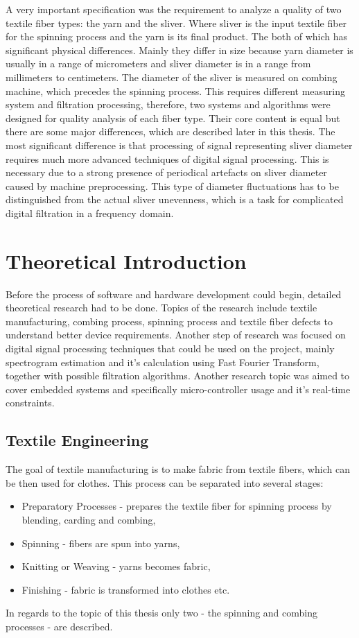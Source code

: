 \documentclass[twoside]{ctuthesis}
\theoremstyle{plain}
\theoremstyle{definition}
\theoremstyle{note}
\begin{document}
A very important specification was the requirement to analyze a quality of two textile fiber types: the  yarn and the sliver. Where sliver is the input textile fiber for the spinning process and the yarn is its final product. The both of which has significant physical differences. Mainly they differ in size because yarn diameter is usually in a range of micrometers and sliver diameter is in a range from millimeters to centimeters. The diameter of the sliver is measured on combing machine, which precedes the spinning process. This requires different measuring system and filtration processing, therefore, two systems and algorithms were designed for quality analysis of each fiber type. Their core content is equal but there are some major differences, which are described later in this thesis. The most significant difference is that processing of signal representing sliver diameter requires much more advanced techniques of digital signal processing. This is necessary due to a strong presence of periodical artefacts on sliver diameter caused by machine preprocessing. This type of diameter fluctuations has to be distinguished from the actual sliver unevenness, which is a task for complicated digital filtration in a frequency domain.

\chapter{Theoretical Introduction}
Before the process of software and hardware development could begin, detailed theoretical research had to be done. Topics of the research include textile manufacturing, combing process, spinning process and textile fiber defects to understand better device requirements. Another step of research was focused on digital signal processing techniques that could be used on the project, mainly spectrogram estimation and it's calculation using Fast Fourier Transform, together with possible filtration algorithms. Another research topic was aimed to cover embedded systems and specifically micro-controller usage and it's real-time constraints.
\section{Textile Engineering}
The goal of textile manufacturing is to make fabric from textile fibers, which can be then used for clothes. This process can be separated into several stages:
\begin{itemize}
	\setlength{\itemsep}{5pt}
\item Preparatory Processes - prepares the textile fiber for spinning process by blending, carding and combing,

\item Spinning - fibers are spun into yarns,

\item Knitting or Weaving - yarns becomes fabric,

\item Finishing - fabric is transformed into clothes etc.
\end{itemize}
In regards to the topic of this thesis only two - the spinning and combing processes - are described.
\end{document}
